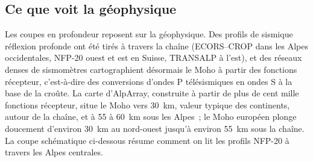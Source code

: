 \subsection*{Ce que voit la géophysique}

Les coupes en profondeur reposent sur la géophysique. Des profils de sismique réflexion profonde ont été tirés
à travers la chaîne (ECORS--CROP dans les Alpes occidentales, NFP-20 ouest et est en Suisse,
TRANSALP à l'est), et des réseaux denses de sismomètres cartographient désormais le Moho
à partir des fonctions récepteur, c'est-à-dire des conversions d'ondes P télésismiques en ondes S
à la base de la croûte. La carte d'AlpArray, construite à partir de plus de cent mille fonctions récepteur,
situe le Moho
vers \qty{30}{km}, valeur typique des continents, autour de la chaîne, et à 55 à
\qty{60}{km} sous les Alpes~; le Moho européen plonge doucement d'environ \qty{30}{km}
au nord-ouest jusqu'à environ \qty{55}{km} sous la chaîne. La coupe schématique ci-dessous résume comment on lit
les profils NFP-20 à travers les Alpes centrales.

